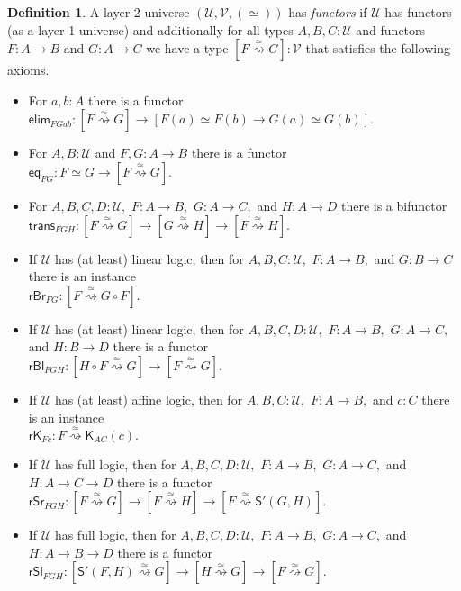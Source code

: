 \documentclass[a4paper]{article}
\theoremstyle{definition}
\newtheorem{definition}{Definition}[section]
\theoremstyle{remark}
\newcommand{\defn}{\emph}
\renewcommand{\equiv}{\simeq}
\newcommand{\equivto}{\overset{\equiv}{\rightsquigarrow}}
\newcommand{\U}{\mathcal{U}}
\newcommand{\V}{\mathcal{V}}
\newcommand{\nm}{\mathsf}
\newcommand{\elim}{\nm{elim}}
\newcommand{\combinator}{\nm}
\newcommand{\constFun}{\combinator{K}}
\newcommand{\substFun}{\combinator{S'}}
\begin{document}
\begin{definition}
  A layer 2 universe $(\U,\V,(\equiv))$ has \defn{functors} if $\U$ has functors (as a layer 1
  universe) and additionally for all types $A,B,C : \U$ and functors $F : A \to B$ and $G : A \to C$
  we have a type $[F \equivto G] : \V$ that satisfies the following axioms.
  \begin{itemize}
    \item For $a,b : A$ there is a functor\\
    $\elim_{FGab} : [F \equivto G] \to [F(a) \equiv F(b) \to G(a) \equiv G(b)].$
    \item For $A,B : \U$ and $F,G : A \to B$ there is a functor\\
    $\nm{eq}_{FG} : F \equiv G \to [F \equivto G].$
    \item For $A,B,C,D : \U,$ $F : A \to B,$ $G : A \to C,$ and $H : A \to D$ there is a bifunctor\\
    $\nm{trans}_{FGH} : [F \equivto G] \to [G \equivto H] \to [F \equivto H].$
    \item If $\U$ has (at least) linear logic, then for $A,B,C : \U,$ $F : A \to B,$ and
    $G : B \to C$ there is an instance\\
    $\nm{rBr}_{FG} : [F \equivto G \circ F].$
    \item If $\U$ has (at least) linear logic, then for $A,B,C,D : \U,$ $F : A \to B,$
    $G : A \to C,$ and $H : B \to D$ there is a functor\\
    $\nm{rBl}_{FGH} : [H \circ F \equivto G] \to [F \equivto G].$
    \item If $\U$ has (at least) affine logic, then for $A,B,C : \U,$ $F : A \to B,$ and $c : C$
    there is an instance\\
    $\nm{rK}_{Fc} : F \equivto \constFun_{AC}(c).$
    \item If $\U$ has full logic, then for $A,B,C,D : \U,$ $F : A \to B,$ $G : A \to C,$ and
    $H : A \to C \to D$ there is a functor\\
    $\nm{rSr}_{FGH} : [F \equivto G] \to [F \equivto H] \to [F \equivto \substFun(G,H)].$
    \item If $\U$ has full logic, then for $A,B,C,D : \U,$ $F : A \to B,$ $G : A \to C,$ and
    $H : A \to B \to D$ there is a functor\\
    $\nm{rSl}_{FGH} : [\substFun(F,H) \equivto G] \to [H \equivto G] \to [F \equivto G].$
  \end{itemize}
\end{definition}
\end{document}
